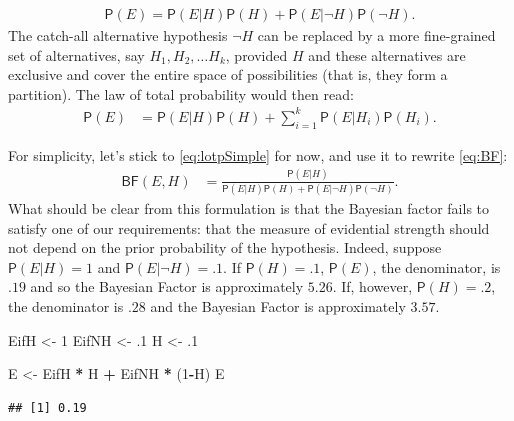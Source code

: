 \documentclass[10pt,dvipsnames,enabledeprecatedfontcommands]{scrartcl}
\newenvironment{Shaded}{\begin{snugshade}}{\end{snugshade}}
\newcommand{\DecValTok}[1]{\textcolor[rgb]{0.00,0.00,0.81}{#1}}
\newcommand{\FloatTok}[1]{\textcolor[rgb]{0.00,0.00,0.81}{#1}}
\newcommand{\NormalTok}[1]{#1}
\newcommand{\OperatorTok}[1]{\textcolor[rgb]{0.81,0.36,0.00}{\textbf{#1}}}
\newcommand{\StringTok}[1]{\textcolor[rgb]{0.31,0.60,0.02}{#1}}
\newcommand{\pr}[1]{\mathsf{P}(#1)}
\begin{document}
\vspace{-3mm}

\begin{align} \label{eq:lotpSimple}
\pr{E}= \pr{E \vert H} \pr{H}+\pr{E \vert \neg H} \pr{\neg H}.
\end{align} \noindent The catch-all alternative hypothesis \(\neg H\)
can be replaced by a more fine-grained set of alternatives, say
\(H_1, H_2, \dots H_k\), provided \(H\) and these alternatives are
exclusive and cover the entire space of possibilities (that is, they
form a partition). The law of total probability would then read:
\begin{align} \label{eq:lotpLong}
\pr{E} & = \pr{E\vert H}\pr{H} +\sum_{i=1}^k \pr{E\vert H_i}\pr{H_i}. 
\end{align}

\noindent For simplicity, let's stick to \eqref{eq:lotpSimple} for now,
and use it to rewrite \eqref{eq:BF}: \begin{align}\label{eq:BFlotp}
\mathsf{BF}(E,H) & = \frac{\pr{E \vert H}}{\pr{E \vert H} \pr{H}+\pr{E \vert \neg H} \pr{\neg H}}.
\end{align} \noindent What should be clear from this formulation is that
the Bayesian factor fails to satisfy one of our requirements: that the
measure of evidential strength should not depend on the prior
probability of the hypothesis. Indeed, suppose \(\pr{E \vert H} = 1\)
and \(\pr{E \vert \neg H} = .1\). If \(\pr{H}=.1\), \(\pr{E}\), the
denominator, is \(.19\) and so the Bayesian Factor is approximately
\(5.26\). If, however, \(\pr{H} =.2\), the denominator is \(.28\) and
the Bayesian Factor is approximately
\(3.57\).

\footnotesize

\begin{Shaded}
\begin{Highlighting}[]
\NormalTok{EifH <-}\StringTok{ }\DecValTok{1}
\NormalTok{EifNH <-}\StringTok{ }\FloatTok{.1}
\NormalTok{H <-}\StringTok{ }\FloatTok{.1}

\NormalTok{E <-}\StringTok{ }\NormalTok{EifH }\OperatorTok{*}\StringTok{ }\NormalTok{H }\OperatorTok{+}\StringTok{ }\NormalTok{EifNH }\OperatorTok{*}\StringTok{ }\NormalTok{(}\DecValTok{1}\OperatorTok{-}\NormalTok{H)}
\NormalTok{E}
\end{Highlighting}
\end{Shaded}

\begin{verbatim}
## [1] 0.19
\end{verbatim}
\end{document}
